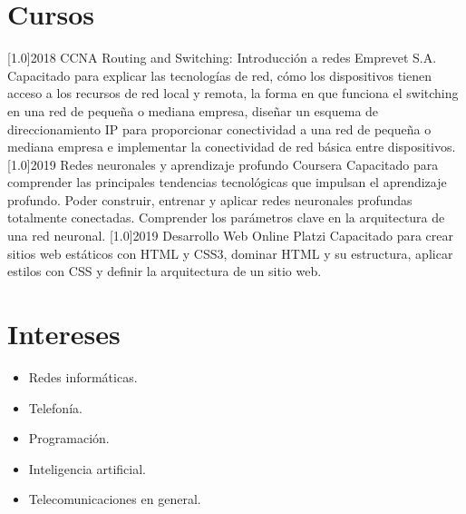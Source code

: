\documentclass[espanol]{cv-style}     %
\begin{document}
\section{Cursos}
  \vspace{-0.2cm}
\begin{entrylist}
\entry
{\scalebox{.8}[1.0]{2018}}
{CCNA Routing and Switching: Introducción a redes}
{Emprevet S.A.}
{Capacitado para explicar las tecnologías de red, cómo los dispositivos tienen acceso a los recursos de red local y remota, la forma en que funciona el switching en una red de pequeña o mediana empresa, diseñar un esquema de direccionamiento IP para proporcionar conectividad a una red de pequeña o mediana empresa e implementar la conectividad de red básica entre dispositivos.}
\entry
{\scalebox{.8}[1.0]{2019}}
{Redes neuronales y aprendizaje profundo}
{Coursera}
{Capacitado para comprender las principales tendencias tecnológicas que impulsan el aprendizaje profundo. Poder construir, entrenar y aplicar redes neuronales profundas totalmente conectadas. Comprender los parámetros clave en la arquitectura de una red neuronal.}
\entry
{\scalebox{.8}[1.0]{2019}}
{Desarrollo Web Online}
{Platzi}
{Capacitado para crear sitios web estáticos con HTML y CSS3, dominar HTML y su estructura, aplicar estilos con CSS y definir la arquitectura de un sitio web.}


\end{entrylist}
  \vspace{-0.2cm}
\section{Intereses}
  \vspace{-0.2cm}
\begin{itemize}
    \item Redes informáticas.
    \item Telefonía.
    \item Programación.
    \item Inteligencia artificial.
    \item Telecomunicaciones en general.
\end{itemize}
\end{document}
